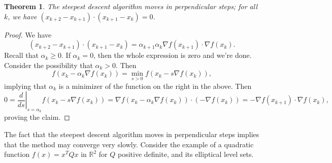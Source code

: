 \documentclass[11pt]{article}
\newcommand{\R}{\mathbb{R}}
\newtheorem{theorem}{Theorem}[subsection]
\begin{document}
\begin{theorem}
The steepest descent algorithm moves in perpendicular steps; for all $k$, we have $(x_{k+2} - x_{k+1})\cdot(x_{k+1} - x_k) = 0$.
\end{theorem}
\begin{proof}
We have
\[
(x_{k+2} - x_{k+1})\cdot(x_{k+1} - x_k) = \alpha_{k+1}\alpha_k \nabla f(x_{k+1}) \cdot \nabla f(x_k).
\]
Recall that $\alpha_k \geq 0$. If $\alpha_k = 0$, then the whole expression is zero and we're done. Consider the possibility that $\alpha_k > 0$. Then
\[
f(x_k - \alpha_k \nabla f(x_k)) = \min_{s > 0} f(x_k - s \nabla f(x_k)),
\]
implying that $\alpha_k$ is a minimizer of the function on the right in the above. Then
\[
0 = \left. \frac{d}{ds} \right|_{s=\alpha_k} f(x_k - s\nabla f(x_k)) = \nabla f(x_k - \alpha_k \nabla f(x_k)) \cdot (-\nabla f(x_k)) = -\nabla f(x_{k+1}) \cdot \nabla f(x_k),
\]
proving the claim.
\end{proof}

The fact that the steepest descent algorithm moves in perpendicular steps implies that the method may converge very slowly. Consider the example of a quadratic function $f(x) = x^TQx$ in $\R^2$ for $Q$ positive definite, and its elliptical level sets. 
\end{document}

